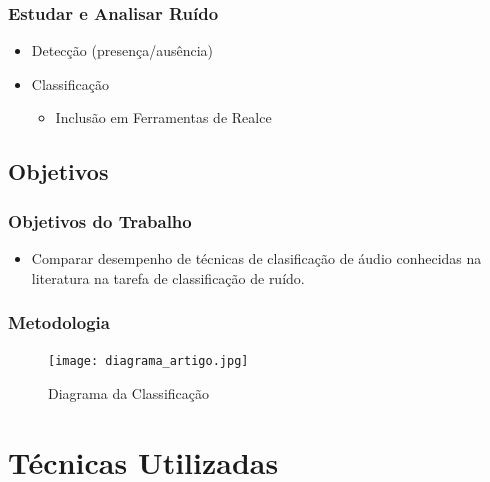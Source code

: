 \documentclass{beamer}
\begin{document}
\begin{frame}
	\justifying
  	\frametitle{Estudar e Analisar Ruído}
  	\begin{itemize}
  		 \setlength\itemsep{1em}
  		\item Detecção (presença/ausência)
        \item Classificação
        \begin{itemize}
        \item Inclusão em Ferramentas de Realce
        \end{itemize}
  	\end{itemize}
\end{frame}

\subsection{Objetivos}

\begin{frame}
	\justifying
  	\frametitle{Objetivos do Trabalho}
  	
  	\begin{itemize}
  		\setlength\itemsep{1em}
  		\item Comparar desempenho de técnicas de clasificação de áudio conhecidas na literatura na tarefa de classificação de ruído.
        
 	\end{itemize}
  		
\end{frame}

\begin{frame}
	\justifying
  	\frametitle{Metodologia}
  	
  	\begin{figure}[ht]
    	\centering
		\texttt{[image: diagrama\_artigo.jpg]}
		\caption{Diagrama da Classificação}
		\label{fig:diagclass}
	\end{figure}

  		
\end{frame}

\section{Técnicas Utilizadas}
\end{document}
